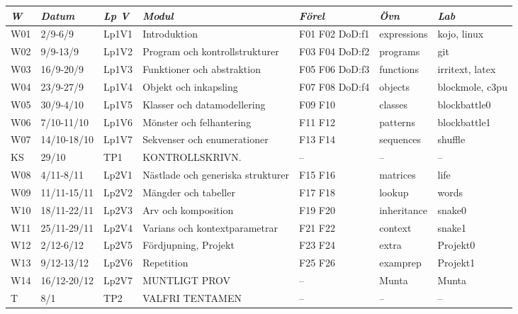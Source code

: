 \begin{tabular}{l|l|l|l|l|l|l}
\textit{W} & \textit{Datum} & \textit{Lp V} & \textit{Modul} & \textit{Förel} & \textit{Övn} & \textit{Lab} \\ \hline \hline
W01 & 2/9-6/9 & Lp1V1 & Introduktion & F01 F02 DoD:f1 & expressions & kojo, linux \\
W02 & 9/9-13/9 & Lp1V2 & Program och kontrollstrukturer & F03 F04 DoD:f2 & programs & git \\
W03 & 16/9-20/9 & Lp1V3 & Funktioner och abstraktion & F05 F06 DoD:f3 & functions & irritext, latex \\
W04 & 23/9-27/9 & Lp1V4 & Objekt och inkapsling & F07 F08 DoD:f4 & objects & blockmole, c3pu \\
W05 & 30/9-4/10 & Lp1V5 & Klasser och datamodellering & F09 F10 & classes & blockbattle0 \\
W06 & 7/10-11/10 & Lp1V6 & Mönster och felhantering & F11 F12 & patterns & blockbattle1 \\
W07 & 14/10-18/10 & Lp1V7 & Sekvenser och enumerationer & F13 F14 & sequences & shuffle \\
KS & 29/10 & TP1 & KONTROLLSKRIVN. & -- & -- & -- \\
W08 & 4/11-8/11 & Lp2V1 & Nästlade och generiska strukturer & F15 F16 & matrices & life \\
W09 & 11/11-15/11 & Lp2V2 & Mängder och tabeller & F17 F18 & lookup & words \\
W10 & 18/11-22/11 & Lp2V3 & Arv och komposition & F19 F20 & inheritance & snake0 \\
W11 & 25/11-29/11 & Lp2V4 & Varians och kontextparametrar & F21 F22 & context & snake1 \\
W12 & 2/12-6/12 & Lp2V5 & Fördjupning, Projekt & F23 F24 & extra & Projekt0 \\
W13 & 9/12-13/12 & Lp2V6 & Repetition & F25 F26 & examprep & Projekt1 \\
W14 & 16/12-20/12 & Lp2V7 & MUNTLIGT PROV & -- & Munta & Munta \\
T & 8/1 & TP2 & VALFRI TENTAMEN & -- & -- & -- \\
\end{tabular}
